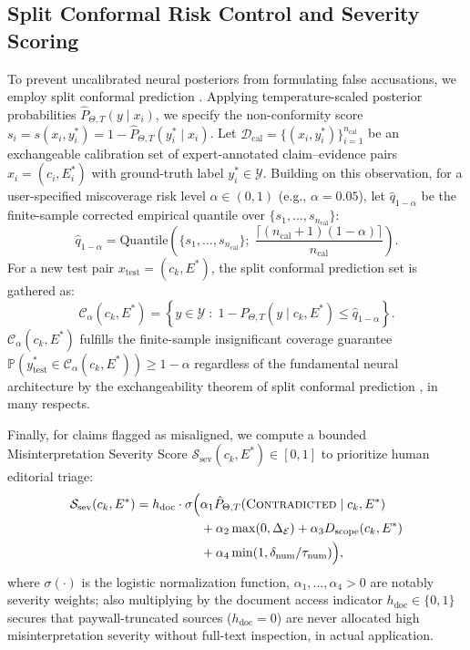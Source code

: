\documentclass[journal]{IEEEtran}
\begin{document}
\subsection{Split Conformal Risk Control and Severity Scoring}
To prevent uncalibrated neural posteriors from formulating false accusations, we employ split conformal prediction \cite{sadinle2019least,angelopoulos2023conformal}. Applying temperature-scaled posterior probabilities $\hat{P}_{\Theta, T}(y \mid x_i)$, we specify the non-conformity score $s_i = s(x_i, y_i^*) = 1 - \hat{P}_{\Theta, T}(y_i^* \mid x_i)$. Let $\mathcal{D}_{\text{cal}} = \{(x_i, y_i^*)\}_{i=1}^{n_{\text{cal}}}$ be an exchangeable calibration set of expert-annotated claim--evidence pairs $x_i = (c_i, E_i^*)$ with ground-truth label $y_i^* \in \mathcal{Y}$. Building on this observation, for a user-specified miscoverage risk level $\alpha \in (0, 1)$ (e.g., $\alpha = 0.05$), let $\hat{q}_{1-\alpha}$ be the finite-sample corrected empirical quantile over $\{s_1, \dots, s_{n_{\text{cal}}}\}$:
\begin{equation}
\hat{q}_{1-\alpha} = \text{Quantile}\!\left(\{s_1, \dots, s_{n_{\text{cal}}}\};\; \frac{\lceil (n_{\text{cal}} + 1)(1 - \alpha) \rceil}{n_{\text{cal}}}\right).
\label{eq:conformal_quantile}
\end{equation}
For a new test pair $x_{\text{test}} = (c_k, E^*)$, the split conformal prediction set is gathered as:
\begin{equation}
\mathcal{C}_{\alpha}(c_k, E^*) = \left\{ y \in \mathcal{Y} \;:\; 1 - \hat{P}_{\Theta, T}(y \mid c_k, E^*) \leq \hat{q}_{1-\alpha} \right\}.
\label{eq:conformal_set}
\end{equation}
$\mathcal{C}_{\alpha}(c_k, E^*)$ fulfills the finite-sample insignificant coverage guarantee $\mathbb{P}(y^*_{\text{test}} \in \mathcal{C}_{\alpha}(c_k, E^*)) \geq 1 - \alpha$ regardless of the fundamental neural architecture by the exchangeability theorem of split conformal prediction \cite{sadinle2019least,angelopoulos2023conformal}, in many respects.

Finally, for claims flagged as misaligned, we compute a bounded Misinterpretation Severity Score $\mathcal{S}_{\text{sev}}(c_k, E^*) \in [0, 1]$ to prioritize human editorial triage:
\begin{equation}
\begin{aligned}
\mathcal{S}_{\text{sev}}(c_k, E^*) = h_{\text{doc}} \cdot \sigma\Big( & \alpha_1 \hat{P}_{\Theta, T}(\textsc{Contradicted} \mid c_k, E^*) \\
& + \alpha_2 \max(0, \Delta_{\mathcal{E}}) + \alpha_3 D_{\text{scope}}(c_k, E^*) \\
& + \alpha_4 \min(1, \delta_{\text{num}} / \tau_{\text{num}}) \Big),
\end{aligned}
\label{eq:severity}
\end{equation}
where $\sigma(\cdot)$ is the logistic normalization function, $\alpha_1, \dots, \alpha_4 > 0$ are notably severity weights; also multiplying by the document access indicator $h_{\text{doc}} \in \{0, 1\}$ secures that paywall-truncated sources ($h_{\text{doc}} = 0$) are never allocated high misinterpretation severity without full-text inspection, in actual application.
\end{document}
